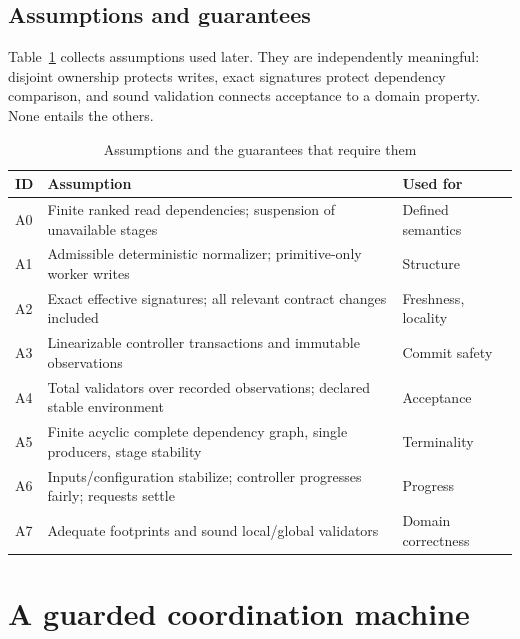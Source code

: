 \documentclass[pdflatex,sn-mathphys-num]{sn-jnl}
\theoremstyle{thmstyleone}
\theoremstyle{thmstylethree}
\theoremstyle{thmstyletwo}
\begin{document}
\subsection{Assumptions and guarantees}
Table~\ref{tab:assumptions} collects assumptions used later. They are independently meaningful: disjoint ownership protects writes, exact signatures protect dependency comparison, and sound validation connects acceptance to a domain property. None entails the others.
\begin{table}[tb]
\caption{Assumptions and the guarantees that require them}\label{tab:assumptions}
\small\begin{tabularx}{\linewidth}{@{}lXl@{}}\toprule
ID & Assumption & Used for\\\midrule
A0 & Finite ranked read dependencies; suspension of unavailable stages & Defined semantics\\
A1 & Admissible deterministic normalizer; primitive-only worker writes & Structure\\
A2 & Exact effective signatures; all relevant contract changes included & Freshness, locality\\
A3 & Linearizable controller transactions and immutable observations & Commit safety\\
A4 & Total validators over recorded observations; declared stable environment & Acceptance\\
A5 & Finite acyclic complete dependency graph, single producers, stage stability & Terminality\\
A6 & Inputs/configuration stabilize; controller progresses fairly; requests settle & Progress\\
A7 & Adequate footprints and sound local/global validators & Domain correctness\\\bottomrule
\end{tabularx}
\end{table}

\section{A guarded coordination machine}\label{sec:machine}
\end{document}
